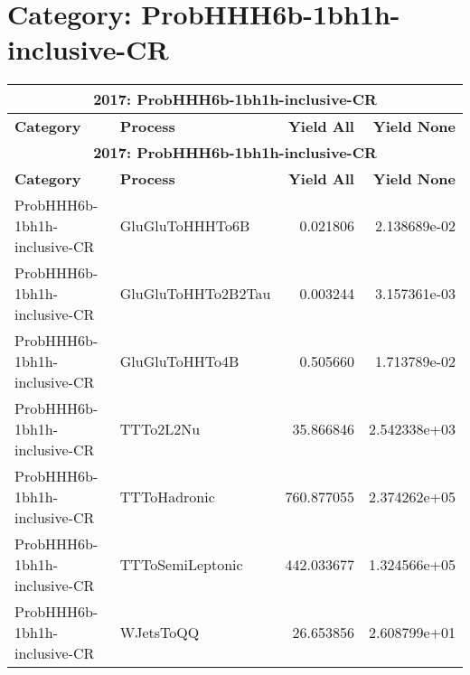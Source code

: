 \documentclass{article}
\begin{document}
\section*{Category: ProbHHH6b-1bh1h-inclusive-CR}
\begin{longtable}[c]{|l|l|r|r|}
\hline
\multicolumn{4}{|c|}{\textbf{2017: ProbHHH6b-1bh1h-inclusive-CR}} \\
\hline
\textbf{Category} & \textbf{Process} & \textbf{Yield All} & \textbf{Yield None} \\
\hline
\endfirsthead
\hline
\multicolumn{4}{|c|}{\textbf{2017: ProbHHH6b-1bh1h-inclusive-CR}} \\
\hline
\textbf{Category} & \textbf{Process} & \textbf{Yield All} & \textbf{Yield None} \\
\hline
\endhead
ProbHHH6b-1bh1h-inclusive-CR & GluGluToHHHTo6B & 0.021806 & 2.138689e-02 \\
\hline
ProbHHH6b-1bh1h-inclusive-CR & GluGluToHHTo2B2Tau & 0.003244 & 3.157361e-03 \\
\hline
ProbHHH6b-1bh1h-inclusive-CR & GluGluToHHTo4B & 0.505660 & 1.713789e-02 \\
\hline
ProbHHH6b-1bh1h-inclusive-CR & TTTo2L2Nu & 35.866846 & 2.542338e+03 \\
\hline
ProbHHH6b-1bh1h-inclusive-CR & TTToHadronic & 760.877055 & 2.374262e+05 \\
\hline
ProbHHH6b-1bh1h-inclusive-CR & TTToSemiLeptonic & 442.033677 & 1.324566e+05 \\
\hline
ProbHHH6b-1bh1h-inclusive-CR & WJetsToQQ & 26.653856 & 2.608799e+01 \\
\hline
\end{longtable}
\end{document}
